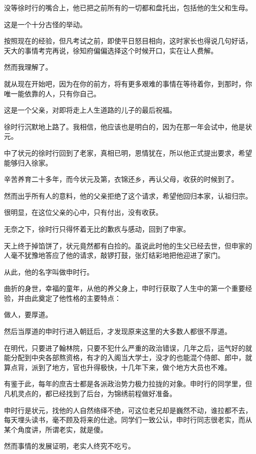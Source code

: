\begin{multicols}{\theparacolNo}
		没等徐时行的嘴合上，他已把之前所有的一切都和盘托出，包括他的生父和生母。

		这是一个十分古怪的举动。

		按照现在的经验，但凡考试之前，即使平日怒目相向，这时家长也得说几句好话，天大的事情考完再说，徐知府偏偏选择这个时候开口，实在让人费解。

		然而我理解了。

		就从现在开始吧，因为在你的前方，将有更多艰难的事情在等待着你，到那时，你唯一能依靠的人，只有你自己。

		这是一个父亲，对即将走上人生道路的儿子的最后祝福。

		徐时行沉默地上路了。我相信，他应该也是明白的，因为在那一年会试中，他是状元。

		中了状元的徐时行回到了老家，真相已明，恩情犹在，所以他正式提出要求，希望能够归入徐家。

		辛苦养育二十多年，而今状元及第，衣锦还乡，再认父母，收获的时候到了。

		然而出乎所有人的意料，他的父亲拒绝了这个请求，希望他回归本家，认祖归宗。

		很明显，在这位父亲的心中，只有付出，没有收获。

		无奈之下，徐时行只得怀着无比的歉疚与感动，回到了申家。

		天上终于掉馅饼了，状元竟然都有白捡的。虽说此时他的生父已经去世，但申家的人毫不犹豫地答应了他的请求，敲锣打鼓，张灯结彩地把他迎进了家门。

		从此，他的名字叫做申时行。

		曲折的身世，幸福的童年，从他的养父身上，申时行获取了人生中的第一个重要经验，并由此奠定了他性格的主要特点：

		做人，要厚道。

		然后当厚道的申时行进入朝廷后，才发现原来这里的大多数人都很不厚道。

		在明代，只要进了翰林院，只要不犯什么严重的政治错误，几年之后，运气好的就能分配到中央各部熬资格，有才的入阁当大学士，没才的也能混个侍郎、郎中，就算点背，派到了地方，官也升得极快，十几年下来，做个地方大员也不难。

		有鉴于此，每年的庶吉士都是各派政治势力极力拉拢的对象。申时行的同学里，但凡机灵点的，都已经找到了后台，为锦绣前程做好准备。

		申时行是状元，找他的人自然络绎不绝，可这位老兄却是巍然不动，谁拉都不去，每天埋头读书，毫不顾及将来的仕途。同学们一致公认，申时行同志很老实，而从某个角度讲，所谓老实，就是傻。

		然而事情的发展证明，老实人终究不吃亏。


\end{multicols}
